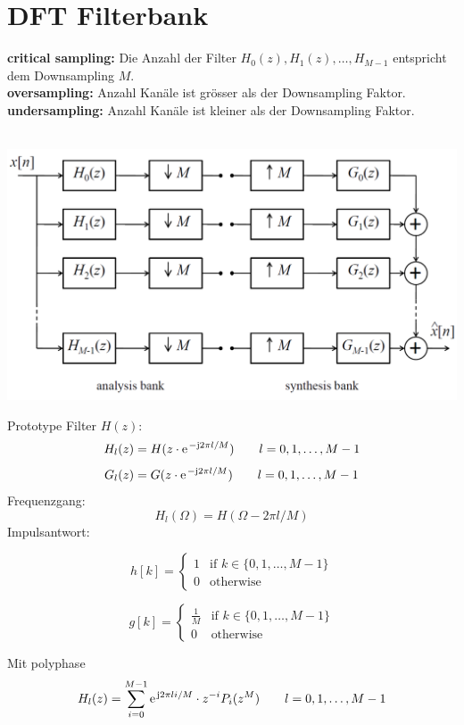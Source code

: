 \section{DFT Filterbank}
\textbf{critical sampling:} Die Anzahl der Filter $H_0(z), H_1(z), \ldots, H_
{M-1}$ entspricht dem Downsampling $M$.\\
\textbf{oversampling:} Anzahl Kanäle ist grösser als der Downsampling Faktor.\\
\textbf{undersampling:} Anzahl Kanäle ist kleiner als der Downsampling Faktor.\\
\\
\begin{center}
	\includegraphics[scale=.7]{./images/critical_sampled}
\end{center}
Prototype Filter $H(z)$:
\[ H_l(z) = H(z\cdot\e^{-\im 2\pi l/M}) \qquad l=0,1,\ldots,M-1 \]
\[ G_l(z) = G(z\cdot\e^{-\im 2\pi l/M}) \qquad l=0,1,\ldots,M-1 \]
Frequenzgang:
\[ H_l(\Omega) = H(\Omega-2\pi l/M) \]
Impulsantwort:\\
\begin{minipage}{.5\textwidth}
	\[ h[k] = \left\lbrace\begin{matrix}
		1	& \textrm{if } k \in \{0,1,\ldots,M-1\}\\
		0	& \textrm{otherwise}
	\end{matrix}\right. \]
\end{minipage}
\begin{minipage}{.5\textwidth}
	\[ g[k] = \left\lbrace\begin{matrix}
		\frac{1}{M}	& \textrm{if } k \in \{0,1,\ldots,M-1\}\\
		0	& \textrm{otherwise}
	\end{matrix}\right. \]
\end{minipage}
Mit polyphase
\[ H_l(z) = \sum_{i=0}^{M-1}\e^{\im 2\pi li/M} \cdot z^{-i} P_i(z^M) 
	\qquad l=0,1,\ldots,M-1 \]

